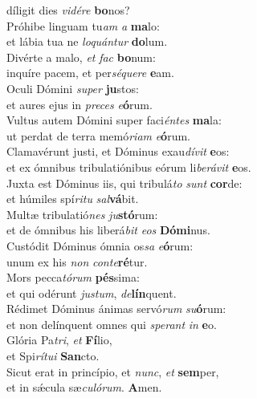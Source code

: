 \evenverse díligit dies \textit{vi}\textit{dé}\textit{re} \textbf{bo}nos?\\
\oddverse Próhibe linguam tu\textit{am} \textit{a} \textbf{ma}lo:~\*\\
\oddverse et lábia tua ne \textit{lo}\textit{quán}\textit{tur} \textbf{do}lum.\\
\evenverse Divérte a malo, \textit{et} \textit{fac} \textbf{bo}num:~\*\\
\evenverse inquíre pacem, et per\textit{sé}\textit{que}\textit{re} \textbf{e}am.\\
\oddverse Oculi Dómini \textit{su}\textit{per} \textbf{ju}stos:~\*\\
\oddverse et aures ejus in \textit{pre}\textit{ces} \textit{e}\textbf{ó}rum.\\
\evenverse Vultus autem Dómini super faci\textit{én}\textit{tes} \textbf{ma}la:~\*\\
\evenverse ut perdat de terra memó\textit{ri}\textit{am} \textit{e}\textbf{ó}rum.\\
\oddverse Clamavérunt justi, et Dóminus exau\textit{dí}\textit{vit} \textbf{e}os:~\*\\
\oddverse et ex ómnibus tribulatiónibus eórum li\textit{be}\textit{rá}\textit{vit} \textbf{e}os.\\
\evenverse Juxta est Dóminus iis, qui tribulá\textit{to} \textit{sunt} \textbf{cor}de:~\*\\
\evenverse et húmiles spí\textit{ri}\textit{tu} \textit{sal}\textbf{vá}bit.\\
\oddverse Multæ tribulatió\textit{nes} \textit{ju}\textbf{stó}rum:~\*\\
\oddverse et de ómnibus his liberá\textit{bit} \textit{e}\textit{os} \textbf{Dó}\textbf{mi}nus.\\
\evenverse Custódit Dóminus ómnia os\textit{sa} \textit{e}\textbf{ó}rum:~\*\\
\evenverse unum ex his \textit{non} \textit{con}\textit{te}\textbf{ré}tur.\\
\oddverse Mors pecca\textit{tó}\textit{rum} \textbf{pés}sima:~\*\\
\oddverse et qui odérunt \textit{ju}\textit{stum}, \textit{de}\textbf{lín}quent.\\
\evenverse Rédimet Dóminus ánimas servó\textit{rum} \textit{su}\textbf{ó}rum:~\*\\
\evenverse et non delínquent omnes qui \textit{spe}\textit{rant} \textit{in} \textbf{e}o.\\
\oddverse Glória Pa\textit{tri}, \textit{et} \textbf{Fí}lio,~\*\\
\oddverse et Spi\textit{rí}\textit{tu}\textit{i} \textbf{San}cto.\\
\evenverse Sicut erat in princípio, et \textit{nunc}, \textit{et} \textbf{sem}per,~\*\\
\evenverse et in sǽcula sæ\textit{cu}\textit{ló}\textit{rum}. \textbf{A}men.\\
